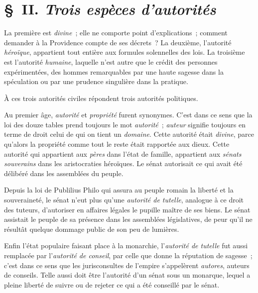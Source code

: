 \documentclass[french,twoside]{book} %
\begin{document}
\section[{§ II. Trois espèces d’autorités}]{§ II. {\itshape Trois espèces d’autorités}}
\noindent La première est {\itshape divine} ; elle ne comporte point d’explications ; comment demander à la Providence compte de ses décrets ? La deuxième, l’autorité {\itshape héroïque}, appartient tout entière aux formules solennelles  des lois. La troisième est l’autorité {\itshape humaine}, laquelle n’est autre que le crédit des personnes expérimentées, des hommes remarquables par une haute sagesse dans la spéculation ou par une prudence singulière dans la pratique.\par
À ces trois autorités civiles répondent trois autorités politiques.\par
Au premier âge, {\itshape autorité} et {\itshape propriété} furent synonymes. C’est dans ce sens que la loi des douze tables prend toujours le mot {\itshape autorité} ; {\itshape auteur} signifie toujours en terme de droit celui de qui on tient un {\itshape domaine}. Cette autorité était {\itshape divine}, parce qu’alors la propriété comme tout le reste était rapportée aux dieux. Cette autorité qui appartient aux {\itshape pères} dans l’état de famille, appartient aux {\itshape sénats souverains} dans les aristocraties héroïques. Le sénat autorisait ce qui avait été délibéré dans les assemblées du peuple.\par
Depuis la loi de Publilius Philo qui assura au peuple romain la liberté et la souveraineté, le sénat n’eut plus qu’une {\itshape autorité de tutelle}, analogue à ce droit des tuteurs, d’autoriser en affaires légales le pupille maître de ses biens. Le sénat assistait le peuple de sa présence dans les assemblées législatives, de peur qu’il ne résultât quelque dommage public de son peu de lumières.\par
Enfin l’état populaire faisant place à la monarchie, l’{\itshape autorité de tutelle} fut aussi remplacée par l’{\itshape autorité de conseil}, par celle que donne la réputation de sagesse ; c’est dans ce sens que les jurisconsultes  de l’empire s’appelèrent {\itshape autores}, auteurs de conseils. Telle aussi doit être l’autorité d’un sénat sous un monarque, lequel a pleine liberté de suivre ou de rejeter ce qui a été conseillé par le sénat.
\end{document}
